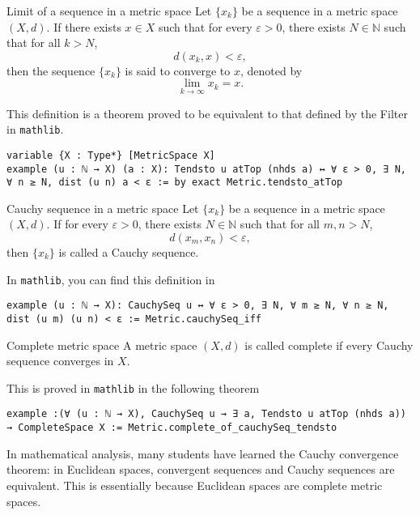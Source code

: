 \documentclass[a4paper]{article}
\begin{document}
\begin{dfn}{Limit of a sequence in a metric space}  
Let \(\{x_k\}\) be a sequence in a metric space \((X,d)\). If there exists \(x \in X\) such that for every \(\varepsilon > 0\), there exists \(N \in \mathbb{N}\) such that for all \(k > N\),  
\[
d(x_k, x) < \varepsilon,
\]  
then the sequence \(\{x_k\}\) is said to converge to \(x\), denoted by  
\[
\lim_{k \to \infty} x_k = x.
\]  
\end{dfn}
This definition is a theorem proved to be equivalent to that defined by the Filter in \texttt{mathlib}.
\begin{xmp}{}
\begin{lstlisting}[style=lean]
variable {X : Type*} [MetricSpace X]
example (u : ℕ → X) (a : X): Tendsto u atTop (nhds a) ↔ ∀ ε > 0, ∃ N, ∀ n ≥ N, dist (u n) a < ε := by exact Metric.tendsto_atTop
\end{lstlisting}
\end{xmp}
\begin{dfn}{Cauchy sequence in a metric space}  
Let \(\{x_k\}\) be a sequence in a metric space \((X,d)\). If for every \(\varepsilon > 0\), there exists \(N \in \mathbb{N}\) such that for all \(m,n > N\),  
\[
d(x_m, x_n) < \varepsilon,
\]  
then \(\{x_k\}\) is called a Cauchy sequence.  
\end{dfn}
In \texttt{mathlib}, you can find this definition in
\begin{xmp}{}
\begin{lstlisting}[style = lean]
example (u : ℕ → X): CauchySeq u ↔ ∀ ε > 0, ∃ N, ∀ m ≥ N, ∀ n ≥ N, dist (u m) (u n) < ε := Metric.cauchySeq_iff
\end{lstlisting}
\end{xmp}
\begin{dfn}{Complete metric space}  
A metric space \((X,d)\) is called complete if every Cauchy sequence converges in \(X\).  
\end{dfn}
This is proved in \texttt{mathlib} in the following theorem
\begin{xmp}{}
\begin{lstlisting}[style = lean]
example :(∀ (u : ℕ → X), CauchySeq u → ∃ a, Tendsto u atTop (nhds a)) → CompleteSpace X := Metric.complete_of_cauchySeq_tendsto
\end{lstlisting}
\end{xmp}
In mathematical analysis, many students have learned the Cauchy convergence theorem: in Euclidean spaces, convergent sequences and Cauchy sequences are equivalent. This is essentially because Euclidean spaces are complete metric spaces.
\end{document}
